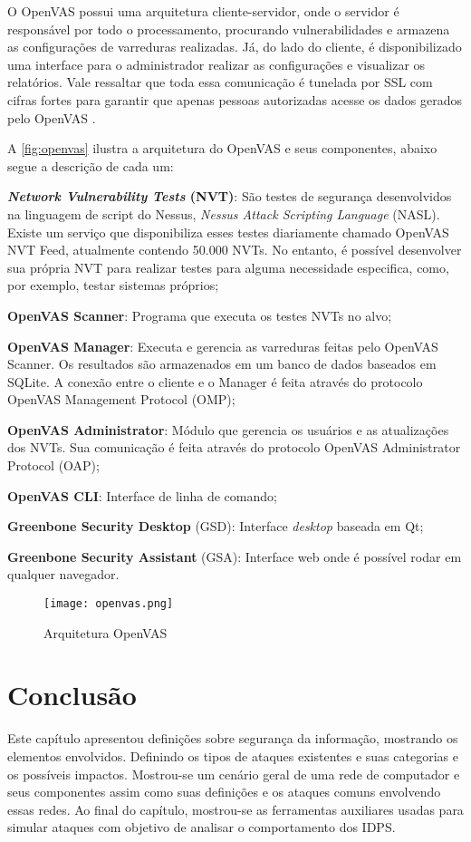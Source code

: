 O OpenVAS possui uma arquitetura cliente-servidor, onde o servidor é responsável por todo o processamento, procurando vulnerabilidades e armazena as configurações de varreduras realizadas. Já, do lado do cliente, é disponibilizado uma interface para o administrador realizar as configurações e visualizar os relatórios. Vale ressaltar que toda essa comunicação é tunelada por SSL com cifras fortes para garantir que apenas pessoas autorizadas acesse os dados gerados pelo OpenVAS \cite{openvas:tim}.

A \autoref{fig:openvas} ilustra a arquitetura do OpenVAS e seus componentes, abaixo segue a descrição de cada um: 

\begin{alineas}
\item \textbf{\textit{Network Vulnerability Tests} (NVT)}: São testes de segurança desenvolvidos na linguagem de script do Nessus, \textit{Nessus Attack Scripting Language} (NASL). Existe um serviço que disponibiliza esses testes diariamente chamado OpenVAS NVT Feed, atualmente contendo 50.000 NVTs. No entanto, é possível desenvolver sua própria NVT para realizar testes para alguma necessidade especifica, como, por exemplo, testar sistemas próprios;
\item \textbf{OpenVAS Scanner}: Programa que executa os testes NVTs no alvo; 
\item \textbf{OpenVAS Manager}: Executa e gerencia as varreduras feitas pelo OpenVAS Scanner. Os resultados são armazenados em um banco de dados baseados em SQLite. A conexão entre o cliente e o Manager é feita através do protocolo OpenVAS Management Protocol (OMP);
\item \textbf{OpenVAS Administrator}: Módulo que gerencia os usuários e as atualizações dos NVTs. Sua comunicação é feita através do protocolo OpenVAS Administrator Protocol (OAP);
\item \textbf{OpenVAS CLI}: Interface de linha de comando;
\item \textbf{Greenbone Security Desktop} (GSD): Interface \textit{desktop} baseada em Qt;
\item \textbf{Greenbone Security Assistant} (GSA): Interface web onde é possível rodar em qualquer navegador.
\end{alineas}

\begin{figure}[!htb]
    \centering
    \caption{Arquitetura OpenVAS} 
    \texttt{[image: openvas.png]}
    \label{fig:openvas}
\end{figure}

\section{Conclusão}

Este capítulo apresentou definições sobre segurança da informação, mostrando os elementos envolvidos. Definindo os tipos de ataques existentes e suas categorias e os possíveis impactos. Mostrou-se um cenário geral de uma rede de computador e seus componentes assim como suas definições e os ataques comuns envolvendo essas redes. Ao final do capítulo, mostrou-se as ferramentas auxiliares usadas para simular ataques com objetivo de analisar o comportamento dos IDPS.
